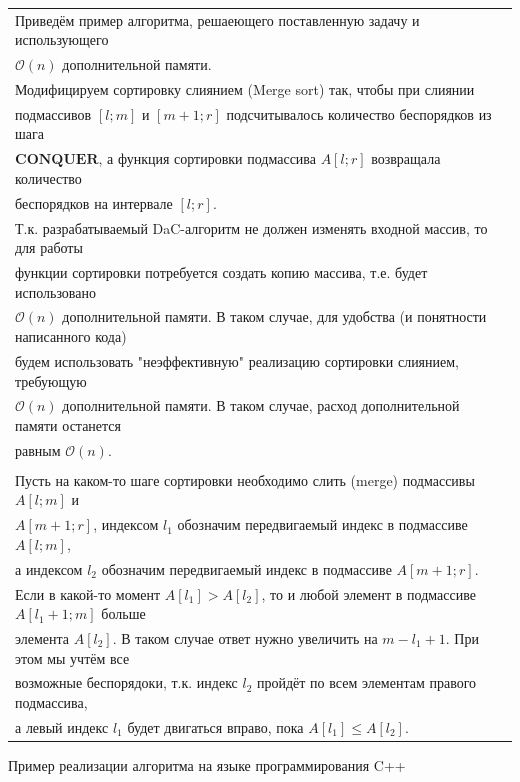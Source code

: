 \documentclass[11pt,a4paper]{article} %
\begin{document}
\begin{tabular}{l}
    Приведём пример алгоритма, решаеющего поставленную задачу и использующего \\
    $ \mathcal{O}(n) $ дополнительной памяти. \\
    Модифицируем сортировку слиянием (Merge sort) так, чтобы при слиянии \\
    подмассивов $ [l; m] $ и $ [m + 1; r] $ подсчитывалось количество $ \textit{беспорядков} $ из шага \\
    $ \textbf{CONQUER} $, а функция сортировки подмассива $ A[l; r] $ возвращала количество \\
    $ \textit{беспорядков} $ на интервале $ [l; r] $. \\
    Т.к. разрабатываемый DaC-алгоритм не должен изменять входной массив, то для работы \\
    функции сортировки потребуется создать копию массива, т.е. будет использовано \\
    $ \mathcal{O}(n) $ дополнительной памяти. В таком случае, для удобства (и понятности написанного кода) \\
    будем использовать "неэффективную" реализацию сортировки слиянием, требующую \\
    $ \mathcal{O}(n) $ дополнительной памяти. В таком случае, расход дополнительной памяти останется \\
    равным $ \mathcal{O}(n) $. \\
    \\
    Пусть на каком-то шаге сортировки необходимо слить (merge) подмассивы $ A[l; m] $ и \\
    $ A[m + 1; r] $, индексом $ l_1 $ обозначим передвигаемый индекс в подмассиве $ A[l; m] $, \\
    а индексом $ l_2 $ обозначим передвигаемый индекс в подмассиве $ A[m + 1; r] $. \\
    Если в какой-то момент $ A[l_1] > A[l_2] $, то и любой элемент в подмассиве $ A[l_1 + 1; m] $ больше \\
    элемента $ A[l_2]. $ В таком случае ответ нужно увеличить на $ m - l_1 + 1 $. При этом мы учтём все \\
    возможные $ \textit{беспорядоки} $, т.к. индекс $ l_2 $ пройдёт по всем элементам правого подмассива, \\
    а левый индекс $ l_1 $ будет двигаться вправо, пока $ A[l_1] \le A[l_2] $.
\end{tabular}

\pagebreak

Пример реализации алгоритма на языке программирования C++
\end{document}
